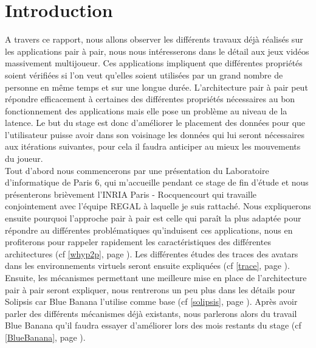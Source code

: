 \section{Introduction}
	A travers ce rapport, nous allons observer les différents travaux déjà réalisés sur les applications pair à pair, nous nous intéresserons dans le détail aux jeux vidéos massivement multijoueur. Ces applications impliquent que différentes propriétés soient vérifiées si l'on veut qu'elles soient utilisées par un grand nombre de personne en même temps et sur une longue durée. L'architecture pair à pair peut répondre efficacement à certaines des différentes propriétés nécessaires au bon fonctionnement des applications mais elle pose un problème au niveau de la latence. Le but du stage est donc d'améliorer le placement des données pour que l'utilisateur puisse avoir dans son voisinage les données qui lui seront nécessaires aux itérations suivantes, pour cela il faudra anticiper au mieux les mouvements du joueur.\\

	Tout d'abord nous commencerons par une présentation du Laboratoire d'informatique de Paris 6, qui m'accueille pendant ce stage de fin d'étude et nous présenterons brièvement l'INRIA Paris - Rocquencourt qui travaille conjointement avec l'équipe REGAL à laquelle je suis rattaché. Nous expliquerons ensuite pourquoi l'approche pair à pair est celle qui paraît la plus adaptée pour répondre au différentes problématiques qu'induisent ces applications, nous en profiterons pour rappeler rapidement les caractéristiques des différentes architectures (cf \ref{whyp2p}, page \pageref{whyp2p}). Les différentes études des traces des avatars dans les environnements virtuels seront ensuite expliquées (cf \ref{trace}, page \pageref{trace}). Ensuite, les mécanismes permettant une meilleure mise en place de l'architecture pair à pair seront expliquer, nous rentrerons un peu plus dans les détails pour Solipsis car Blue Banana l'utilise comme base (cf \ref{solipsis}, page \pageref{solipsis}). Après avoir parler des différents mécanismes déjà existants, nous parlerons alors du travail Blue Banana qu'il faudra essayer d'améliorer lors des mois restants du stage (cf \ref{BlueBanana}, page \pageref{BlueBanana}).

